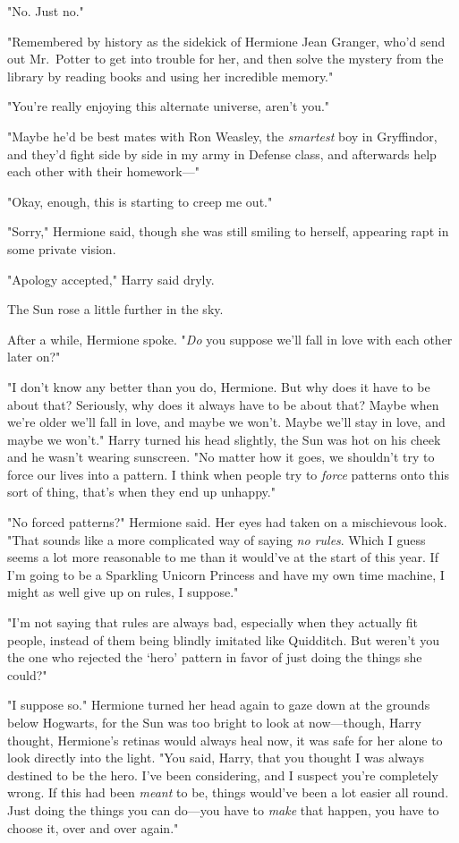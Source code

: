 "No. Just no."

"Remembered by history as the sidekick of Hermione Jean Granger, who'd send out
Mr.~Potter to get into trouble for her, and then solve the mystery from the
library by reading books and using her incredible memory."

"You're really enjoying this alternate universe, aren't you."

"Maybe he'd be best mates with Ron Weasley, the \emph{smartest} boy in
Gryffindor, and they'd fight side by side in my army in Defense class, and
afterwards help each other with their homework\mbox{---}"

"Okay, enough, this is starting to creep me out."

"Sorry," Hermione said, though she was still smiling to herself, appearing rapt
in some private vision.

"Apology accepted," Harry said dryly.

The Sun rose a little further in the sky.

After a while, Hermione spoke. "\emph{Do} you suppose we'll fall in love with
each other later on?"

"I don't know any better than you do, Hermione. But why does it have to be
about that? Seriously, why does it always have to be about that? Maybe when
we're older we'll fall in love, and maybe we won't. Maybe we'll stay in love,
and maybe we won't." Harry turned his head slightly, the Sun was hot on his
cheek and he wasn't wearing sunscreen. "No matter how it goes, we shouldn't try
to force our lives into a pattern. I think when people try to \emph{force}
patterns onto this sort of thing, that's when they end up unhappy."

"No forced patterns?" Hermione said. Her eyes had taken on a mischievous look.
"That sounds like a more complicated way of saying \emph{no rules}. Which I
guess seems a lot more reasonable to me than it would've at the start of this
year. If I'm going to be a Sparkling Unicorn Princess and have my own time
machine, I might as well give up on rules, I suppose."

"I'm not saying that rules are always bad, especially when they actually fit
people, instead of them being blindly imitated like Quidditch. But weren't you
the one who rejected the `hero' pattern in favor of just doing the things she
could?"

"I suppose so." Hermione turned her head again to gaze down at the grounds
below Hogwarts, for the Sun was too bright to look at now---though, Harry
thought, Hermione's retinas would always heal now, it was safe for her alone to
look directly into the light. "You said, Harry, that you thought I was always
destined to be the hero. I've been considering, and I suspect you're completely
wrong. If this had been \emph{meant} to be, things would've been a lot easier
all round. Just doing the things you can do---you have to \emph{make} that
happen, you have to choose it, over and over again."

